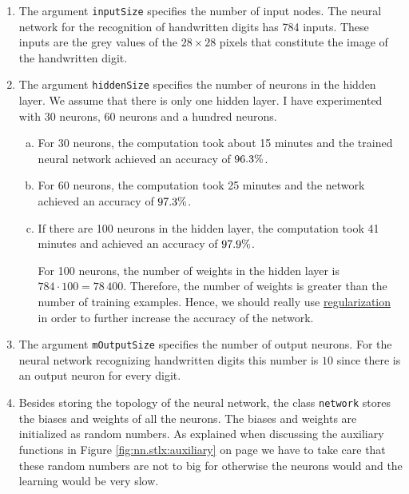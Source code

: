\begin{enumerate}
\item The argument \texttt{inputSize} specifies the number of input nodes.  The neural network for the
      recognition of handwritten digits has 784 inputs.  These inputs are the grey values of the $28 \times 28$
      pixels that constitute the image of the handwritten digit.
\item The argument \texttt{hiddenSize} specifies the number of neurons in the hidden layer.  We assume that
      there is only one hidden layer.  I have experimented with 30 neurons, 60 neurons and a hundred neurons.
      \begin{enumerate}[(a)]
      \item For 30 neurons, the computation took about 15 minutes and the trained neural network achieved an
            accuracy of $96.3\symbol{37}$.
      \item For 60 neurons, the computation took 25 minutes and the network achieved an accuracy of
            $97.3\symbol{37}$.
      \item If there are 100 neurons in the hidden layer, the computation took 41 minutes and achieved an
            accuracy of $97.9\symbol{37}$.

            For 100 neurons, the number of weights in the hidden layer is $784 \cdot 100 = 78\,400$.
            Therefore, the number of weights is greater than the number of training examples.  Hence,
            we should really use \href{http://neuralnetworksanddeeplearning.com/chap3.html}{regularization} in
            order to further increase the accuracy of the network.
      \end{enumerate}
\item The argument \texttt{mOutputSize} specifies the number of output neurons.  For the neural network
      recognizing handwritten digits this number is $10$ since there is an output neuron for every digit.
\item Besides storing the topology of the neural network, the class \texttt{network} stores the biases and
      weights of all the neurons.  The biases and weights are initialized as random numbers.  As explained when
      discussing the auxiliary functions in Figure \ref{fig:nn.stlx:auxiliary} on page
      \pageref{fig:nn.stlx:auxiliary} we have to take care that these random numbers are not to big for
      otherwise the neurons would  and the learning would be very slow.
\end{enumerate}


